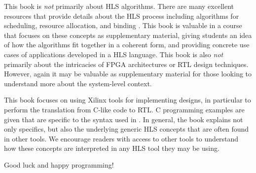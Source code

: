 This book is {\em not} primarily about HLS algorithms.  There are many excellent resources that provide details about the HLS process including algorithms for scheduling, resource allocation, and binding \cite{micheli1994synthesis, gupta2004spark, coussy2010high, gajski2012high}.  This book is valuable in a course that focuses on these concepts as supplementary material, giving students an idea of how the algorithms fit together in a coherent form, and providing concrete use cases of applications developed in a HLS language.  This book is also {\em not} primarily about the intricacies of FPGA architectures or RTL design techniques.  However, again it may be valuable as supplementary material for those looking to understand more about the system-level context.

This book focuses on using Xilinx tools for implementing designs, in particular \VHLS to perform the translation from C-like code to RTL.  C programming examples are given that are specific to the syntax used in \VHLS.  In general, the book explains not only \VHLS specifics, but also the underlying generic HLS concepts that are often found in other tools.  We encourage readers with access to other tools to understand how these concepts are interpreted in any HLS tool they may be using.

Good luck and happy programming!
